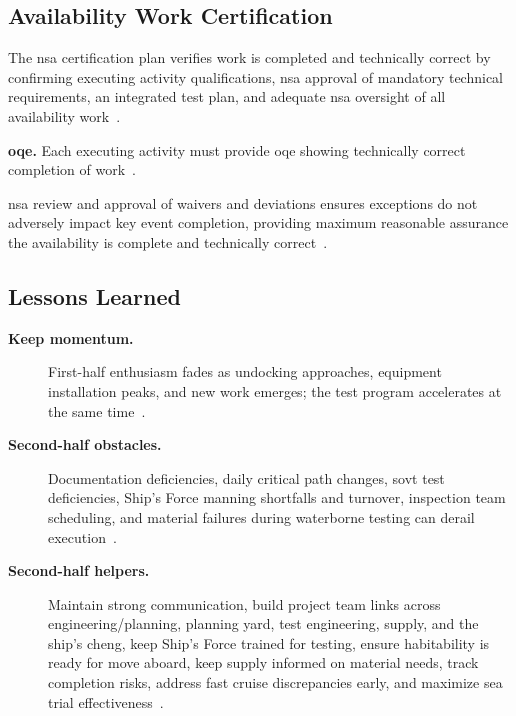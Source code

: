 \documentclass[../main.tex]{subfiles}
\begin{document}
\subsection{Availability Work Certification}
\begin{description}
  \item[\textbf{Certification plan.}] The \ac{nsa} certification plan verifies work is completed and technically correct by confirming executing activity qualifications, \ac{nsa} approval of mandatory technical requirements, an integrated test plan, and adequate \ac{nsa} oversight of all availability work~\autocite{edo-4-2-2-cno-availability-execution-2025}.
  \item \textbf{\ac{oqe}.} Each executing activity must provide \ac{oqe} showing technically correct completion of work~\autocite{edo-4-2-2-cno-availability-execution-2025}.
  \item[\textbf{Waivers and deviations.}] \ac{nsa} review and approval of waivers and deviations ensures exceptions do not adversely impact key event completion, providing maximum reasonable assurance the availability is complete and technically correct~\autocite{edo-4-2-2-cno-availability-execution-2025}.
\end{description}

\subsection{Lessons Learned}
\begin{description}
  \item[\textbf{Keep momentum.}] First-half enthusiasm fades as undocking approaches, equipment installation peaks, and new work emerges; the test program accelerates at the same time~\autocite{edo-4-2-2-cno-availability-execution-2025}.
  \item[\textbf{Second-half obstacles.}] Documentation deficiencies, daily critical path changes, \ac{sovt} test deficiencies, Ship's Force manning shortfalls and turnover, inspection team scheduling, and material failures during waterborne testing can derail execution~\autocite{edo-4-2-2-cno-availability-execution-2025}.
  \item[\textbf{Second-half helpers.}] Maintain strong communication, build project team links across engineering/planning, planning yard, test engineering, supply, and the ship's \ac{cheng}, keep Ship's Force trained for testing, ensure habitability is ready for move aboard, keep supply informed on material needs, track completion risks, address fast cruise discrepancies early, and maximize sea trial effectiveness~\autocite{edo-4-2-2-cno-availability-execution-2025}.
\end{description}
\end{document}

